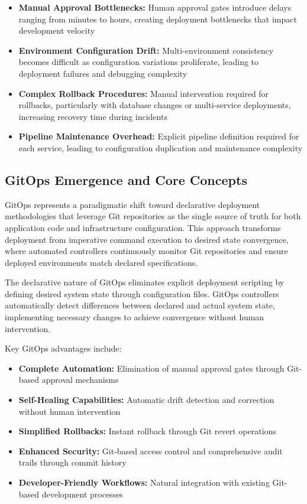 \begin{itemize}
\item \textbf{Manual Approval Bottlenecks:} Human approval gates introduce delays ranging from minutes to hours, creating deployment bottlenecks that impact development velocity
\item \textbf{Environment Configuration Drift:} Multi-environment consistency becomes difficult as configuration variations proliferate, leading to deployment failures and debugging complexity
\item \textbf{Complex Rollback Procedures:} Manual intervention required for rollbacks, particularly with database changes or multi-service deployments, increasing recovery time during incidents
\item \textbf{Pipeline Maintenance Overhead:} Explicit pipeline definition required for each service, leading to configuration duplication and maintenance complexity
\end{itemize}

\subsection{GitOps Emergence and Core Concepts}

GitOps represents a paradigmatic shift toward declarative deployment methodologies that leverage Git repositories as the single source of truth for both application code and infrastructure configuration. This approach transforms deployment from imperative command execution to desired state convergence, where automated controllers continuously monitor Git repositories and ensure deployed environments match declared specifications.

The declarative nature of GitOps eliminates explicit deployment scripting by defining desired system state through configuration files. GitOps controllers automatically detect differences between declared and actual system state, implementing necessary changes to achieve convergence without human intervention.

Key GitOps advantages include:

\begin{itemize}
\item \textbf{Complete Automation:} Elimination of manual approval gates through Git-based approval mechanisms
\item \textbf{Self-Healing Capabilities:} Automatic drift detection and correction without human intervention
\item \textbf{Simplified Rollbacks:} Instant rollback through Git revert operations
\item \textbf{Enhanced Security:} Git-based access control and comprehensive audit trails through commit history
\item \textbf{Developer-Friendly Workflows:} Natural integration with existing Git-based development processes
\end{itemize}

